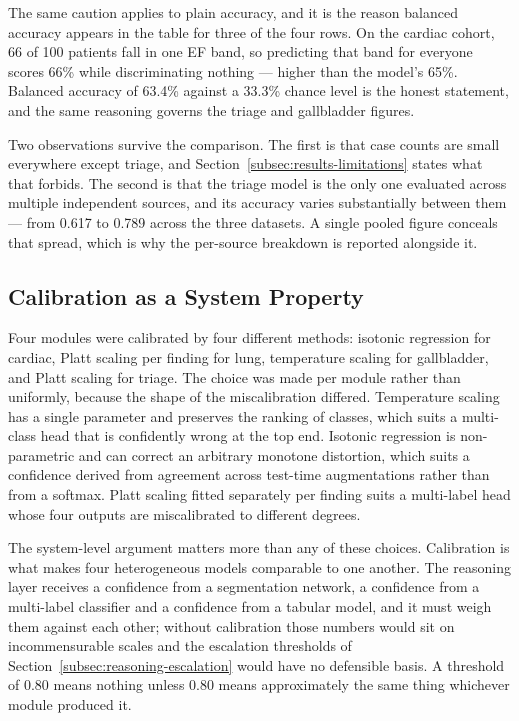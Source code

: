 The same caution applies to plain accuracy, and it is the reason balanced accuracy appears in
the table for three of the four rows. On the cardiac cohort, 66 of 100 patients fall in one EF
band, so predicting that band for everyone scores 66\% while discriminating nothing --- higher
than the model's 65\%. Balanced accuracy of 63.4\% against a 33.3\% chance level is the honest
statement, and the same reasoning governs the triage and gallbladder figures.

Two observations survive the comparison. The first is that case counts are small everywhere
except triage, and Section~\ref{subsec:results-limitations} states what that forbids. The
second is that the triage model is the only one evaluated across multiple independent sources,
and its accuracy varies substantially between them --- from 0.617 to 0.789 across the three
datasets. A single pooled figure conceals that spread, which is why the per-source breakdown
is reported alongside it.

\subsection{Calibration as a System Property}
\label{subsec:results-calibration}

Four modules were calibrated by four different methods: isotonic regression for cardiac, Platt
scaling per finding for lung, temperature scaling for gallbladder, and Platt scaling for
triage. The choice was made per module rather than uniformly, because the shape of the
miscalibration differed. Temperature scaling has a single parameter and preserves the ranking
of classes, which suits a multi-class head that is confidently wrong at the top end. Isotonic
regression is non-parametric and can correct an arbitrary monotone distortion, which suits a
confidence derived from agreement across test-time augmentations rather than from a softmax.
Platt scaling fitted separately per finding suits a multi-label head whose four outputs are
miscalibrated to different degrees.

The system-level argument matters more than any of these choices. Calibration is what makes
four heterogeneous models comparable to one another. The reasoning layer receives a confidence
from a segmentation network, a confidence from a multi-label classifier and a confidence from
a tabular model, and it must weigh them against each other; without calibration those numbers
would sit on incommensurable scales and the escalation thresholds of
Section~\ref{subsec:reasoning-escalation} would have no defensible basis. A threshold of 0.80
means nothing unless 0.80 means approximately the same thing whichever module produced it.

